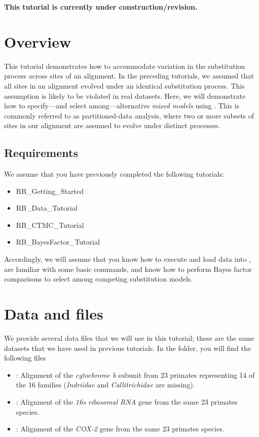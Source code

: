 \bigskip
\begin{center}
\textbf{\Large \color{red}This tutorial is currently under construction/revision.}
\end{center}
\bigskip

\section{Overview}


This tutorial demonstrates how to accommodate variation in the substitution process across sites of an alignment.
In the preceding tutorials, we assumed that all sites in an alignment evolved under an identical substitution process.
This assumption is likely to be violated in real datasets.  
Here, we will demonstrate how to specify---and select among---alternative \emph{mixed models} using \RevBayes.
This is commonly referred to as partitioned-data analysis, where two or more subsets of sites in our alignment are assumed to evolve under distinct processes.

\subsection{Requirements}
We assume that you have previously completed the following tutorials:
\begin{itemize}
\item RB\_Getting\_Started
\item RB\_Data\_Tutorial
\item RB\_CTMC\_Tutorial
\item RB\_BayesFactor\_Tutorial
\end{itemize}
Accordingly, we will assume that you know how to execute and load data into \RevBayes, are familiar with some basic commands, and know how to perform Bayes factor comparisons to select among competing substitution models.



\section{Data and files}

We provide several data files that we will use in this tutorial; these are the same datasets that we have used in previous tutorials.
In the  folder, you will find the following files
\begin{itemize}
\item
{}: Alignment of the \textit{cytochrome b} subunit from 23 primates representing 14 of the 16 families (\textit{Indriidae} and \textit{Callitrichidae} are missing).
\item
{}: Alignment of the \textit{16s ribosomal RNA} gene from the same 23 primates species.
\item
{}: Alignment of the \textit{COX-2} gene from the same 23 primates species.
\end{itemize}



